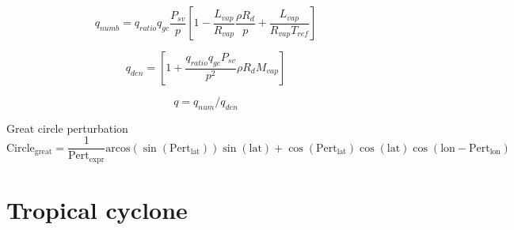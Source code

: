 \documentclass[times,doublespace]{fldauth}
\begin{document}
\begin{equation}
 q_{numb}=q_{ratio}q_{gc}\frac{P_{sv}}{p}\left[1-\frac{L_{vap}}{R_{vap}}\frac{\rho R_d}{p} + \frac{L_{vap}}{R_{vap} T_{ref}} \right]
\end{equation}

\begin{equation}
 q_{den}=\left[1+\frac{q_{ratio}q_{gc}P_{sv}}{p^2}\rho R_d M_{vap} \right]
\end{equation}

\begin{equation}
 q=q_{num}/q_{den}
\end{equation}

Great circle perturbation \\
\begin{equation*}
\text{Circle}_{\text{great}}=\frac{1}{\text{Pert}_{\text{expr}}}\text{arcos}(\sin(\text{Pert}_{\text{lat}}))\sin(\text{lat})+\cos(\text{Pert}_{\text{lat}})\cos(\text{lat})\cos(\text{lon}-\text{Pert}_{\text{lon}})
\end{equation*}


\clearpage 



\section{Tropical cyclone}
\end{document}
